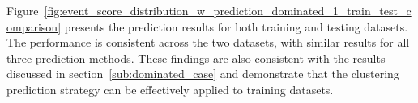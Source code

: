 \documentclass[12pt]{article}
\begin{document}
        Figure~\ref{fig:event_score_distribution_w_prediction_dominated_1_train_test_comparison} presents the prediction results for both training and testing datasets. The performance is consistent across the two datasets, with similar results for all three prediction methods. These findings are also consistent with the results discussed in section~\ref{sub:dominated_case} and demonstrate that the clustering prediction strategy can be effectively applied to training datasets.
        \begin{figure}[htpb]
            \centering
             \\  
\end{figure}
\end{document}
